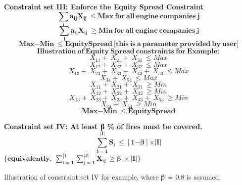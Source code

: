 \documentclass{article} %
\begin{document}
\noindent \textbf{Constraint set III: Enforce the Equity Spread Constraint}
\[\sum_{\boldsymbol{i}}{{\boldsymbol{a}}_{\boldsymbol{ij}}{\boldsymbol{X}}_{\boldsymbol{ij}}\boldsymbol{\ }\boldsymbol{\le }\boldsymbol{Max}\boldsymbol{\ }\boldsymbol{for}\boldsymbol{\ }\boldsymbol{all}\boldsymbol{\ }\boldsymbol{engine}\boldsymbol{\ }\boldsymbol{companies}\boldsymbol{\ }\boldsymbol{j}}\] 
\[\sum_{\boldsymbol{i}}{{\boldsymbol{a}}_{\boldsymbol{ij}}{\boldsymbol{X}}_{\boldsymbol{ij}}\boldsymbol{\ }\boldsymbol{\ge }\boldsymbol{Min}\boldsymbol{\ }\boldsymbol{for}\boldsymbol{\ }\boldsymbol{all}\boldsymbol{\ }\boldsymbol{engine}\boldsymbol{\ }\boldsymbol{companies}\boldsymbol{\ }\boldsymbol{j}}\] 
\[\boldsymbol{Max}\boldsymbol{-}\boldsymbol{Min}\boldsymbol{\ }\boldsymbol{\le }\boldsymbol{EquitySpread}\boldsymbol{\ }\boldsymbol{[}\boldsymbol{this}\boldsymbol{\ }\boldsymbol{is}\boldsymbol{\ }\boldsymbol{a}\boldsymbol{\ }\boldsymbol{parameter}\boldsymbol{\ }\boldsymbol{provided}\boldsymbol{\ }\boldsymbol{by}\boldsymbol{\ }\boldsymbol{user}\boldsymbol{]}\] 
\[\boldsymbol{Illustration}\boldsymbol{\ }\boldsymbol{of}\boldsymbol{\ }\boldsymbol{Equity}\boldsymbol{\ }\boldsymbol{Spread}\boldsymbol{\ }\boldsymbol{constraints}\boldsymbol{\ }\boldsymbol{for}\boldsymbol{\ }\boldsymbol{Example}:\] 
\[X_{11}+\ X_{21}+\ X_{31}\ \le Max\] 
\[X_{12}+\ X_{22}+\ X_{32}\ \le Max\] 
\[X_{13}+\ X_{23}+\ X_{33}+\ X_{43}+\ X_{53}\ \le Max\] 
\[X_{34}+\ X_{54}\ \le Max\] 
\[X_{11}+\ X_{21}+\ X_{31}\ \ge Min\] 
\[X_{12}+\ X_{22}+\ X_{32}\ \ge Min\] 
\[X_{13}+\ X_{23}+\ X_{33}+\ X_{43}+\ X_{53}\ \ge Min\] 
\[X_{34}+\ X_{54}\ \ge Min\] 
\[\boldsymbol{Max}\boldsymbol{-}\boldsymbol{Min}\boldsymbol{\ }\boldsymbol{\le }\boldsymbol{EquitySpread}\] 


\noindent \textbf{Constraint set IV: At least $\boldsymbol{\betaup}$ \% of fires must be covered.}
\[\sum^{\boldsymbol{|}\boldsymbol{I}\boldsymbol{|}}_{\boldsymbol{i}\boldsymbol{=}\boldsymbol{1}}{{\boldsymbol{S}}_{\boldsymbol{i}}}\boldsymbol{\ }\boldsymbol{\le }\left[\boldsymbol{1}\boldsymbol{-}\boldsymbol{\beta }\right]\boldsymbol{\times |}\boldsymbol{I}\boldsymbol{|}\] 
$\{\boldsymbol{equivalently}\boldsymbol{,\ }\sum^{\left|\boldsymbol{I}\right|}_{\boldsymbol{i}\boldsymbol{=}\boldsymbol{1}}{\sum^{\left|\boldsymbol{J}\right|}_{\boldsymbol{j}\boldsymbol{=}\boldsymbol{1}}{{\boldsymbol{X}}_{\boldsymbol{ij}}}}\boldsymbol{\ }\boldsymbol{\ge }\boldsymbol{\beta }\boldsymbol{\ \times |}\boldsymbol{I}\boldsymbol{|}$\textbf{$\boldsymbol{\}}$}

\noindent Illustration of constraint set IV for example, where $\betaup$ = 0.8 is assumed.
\end{document}
